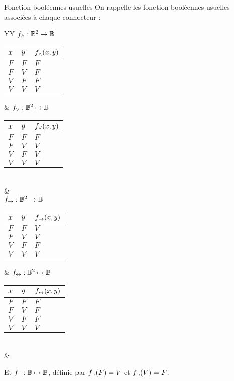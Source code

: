 \documentclass[10pt]{beamer}
\begin{document}
\begin{frame}{\Ctitle}{\stitle}
	\begin{block}{Fonction booléennes usuelles}
		On rappelle les fonction booléennes usuelles associées à chaque connecteur :
		\begin{tabularx}{\textwidth}{YY}
			$f_{\wedge} : \mathbb{B}^2 \mapsto \mathbb{B}$ \newline
			\begin{tabular}{l|l|l}
				$x$ & $y$ & $f_{\wedge}(x,y)$ \\
				\hline
				$F$ & $F$ & $F$            \\
				$F$ & $V$ & $F$            \\
				$V$ & $F$ & $F$            \\
				$V$ & $V$ & $V$            \\
			\end{tabular} &
			$f_{\vee} : \mathbb{B}^2 \mapsto \mathbb{B}$ \newline
			\begin{tabular}{l|l|l}
				$x$ & $y$ & $f_{\vee}(x,y)$ \\
				\hline
				$F$ & $F$ & $F$            \\
				$F$ & $V$ & $V$            \\
				$V$ & $F$ & $V$            \\
				$V$ & $V$ & $V$            \\
			\end{tabular}      \\
			                                                    & \\
			$f_{\to} : \mathbb{B}^2 \mapsto \mathbb{B}$ \newline
			\begin{tabular}{l|l|l}
				$x$ & $y$ & $f_{\to}(x,y)$ \\
				\hline
				$F$ & $F$ & $V$             \\
				$F$ & $V$ & $V$             \\
				$V$ & $F$ & $F$             \\
				$V$ & $V$ & $V$             \\
			\end{tabular} &
			$f_{\leftrightarrow} : \mathbb{B}^2 \mapsto \mathbb{B}$ \newline
			\begin{tabular}{l|l|l}
				$x$ & $y$ & $f_{\leftrightarrow}(x,y)$ \\
				\hline
				$F$ & $F$ & $F$            \\
				$F$ & $V$ & $F$            \\
				$V$ & $F$ & $F$            \\
				$V$ & $V$ & $V$            \\
			\end{tabular}      \\
			                                                    & \\
		\end{tabularx}
		Et $f_{\neg} : \mathbb{B} \mapsto \mathbb{B}$, définie par $f_\neg(F) = V$ et $f_\neg(V) = F$.
	\end{block}
\end{frame}
\end{document}
